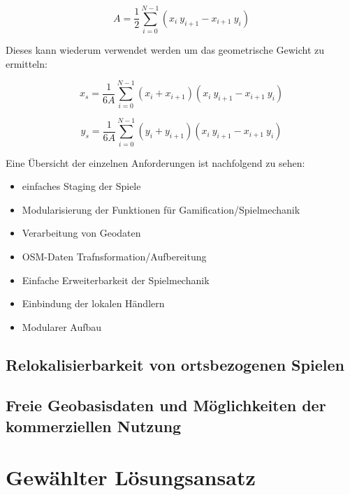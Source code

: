 \begin{equation}
A = \frac{1}{2}\sum_{i=0}^{N-1} (x_i\ y_{i+1} - x_{i+1}\ y_i)
\end{equation}

Dieses kann wiederum verwendet werden um das geometrische Gewicht zu ermitteln:

\begin{equation}
x_s = \frac{1}{6A}\sum_{i=0}^{N-1}(x_i+x_{i+1})(x_i\ y_{i+1} - x_{i+1}\ y_i)
\end{equation}

\begin{equation}
y_s = \frac{1}{6A}\sum_{i=0}^{N-1}(y_i+y_{i+1})(x_i\ y_{i+1} - x_{i+1}\ y_i)
\end{equation}

Eine Übersicht der einzelnen Anforderungen ist nachfolgend zu sehen:

\begin{itemize}
\item einfaches Staging der Spiele
\item Modularisierung der Funktionen für Gamification/Spielmechanik
\item Verarbeitung von Geodaten
\item OSM-Daten Trafnsformation/Aufbereitung
\item Einfache Erweiterbarkeit der Spielmechanik
\item Einbindung der lokalen Händlern
\item Modularer Aufbau
\end{itemize}


\subsection*{Relokalisierbarkeit von ortsbezogenen Spielen}

\subsection*{Freie Geobasisdaten und Möglichkeiten der kommerziellen Nutzung}

\section{Gewählter Lösungsansatz}



